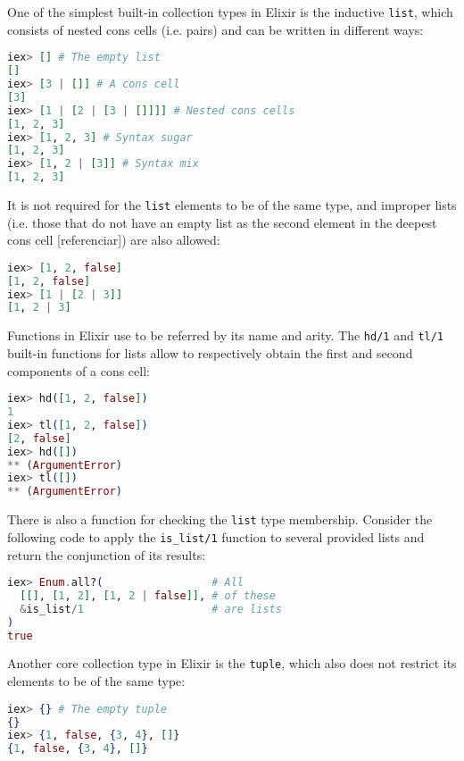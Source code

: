 One of the simplest built-in collection types in Elixir is the inductive 
\verb|list|, which consists of nested cons cells (i.e. pairs) and can be
written in different ways:

\begin{lstlisting}[language=elixir,numbers=none,frame=none]
iex> [] # The empty list 
[] 
iex> [3 | []] # A cons cell
[3]
iex> [1 | [2 | [3 | []]]] # Nested cons cells
[1, 2, 3]
iex> [1, 2, 3] # Syntax sugar
[1, 2, 3]
iex> [1, 2 | [3]] # Syntax mix
[1, 2, 3]
\end{lstlisting}

It is not required for the \verb|list| elements to be of the same type, and
improper lists (i.e. those that do not have an empty list as the second element
in the deepest cons cell [referenciar]) are also allowed:

\begin{lstlisting}[language=elixir,numbers=none,frame=none]
iex> [1, 2, false]
[1, 2, false]
iex> [1 | [2 | 3]] 
[1, 2 | 3]
\end{lstlisting}

Functions in Elixir use to be referred by its name and arity. The \verb|hd/1|
and \verb|tl/1| built-in functions for lists allow to respectively obtain the
first and second components of a cons cell:

\begin{lstlisting}[language=elixir,numbers=none,frame=none]
iex> hd([1, 2, false])
1
iex> tl([1, 2, false])
[2, false]
iex> hd([])
** (ArgumentError)
iex> tl([])
** (ArgumentError)
\end{lstlisting}

There is also a function for checking the \verb|list| type membership. Consider
the following code to apply the \verb|is_list/1| function to several provided 
lists and return the conjunction of its results:

\begin{lstlisting}[language=elixir,numbers=none,frame=none]
iex> Enum.all?(                 # All
  [[], [1, 2], [1, 2 | false]], # of these
  &is_list/1                    # are lists
)
true
\end{lstlisting}

Another core collection type in Elixir is the \verb|tuple|, which also does not
restrict its elements to be of the same type:

\begin{lstlisting}[language=elixir,numbers=none,frame=none]
iex> {} # The empty tuple
{}
iex> {1, false, {3, 4}, []}
{1, false, {3, 4}, []}
\end{lstlisting}

